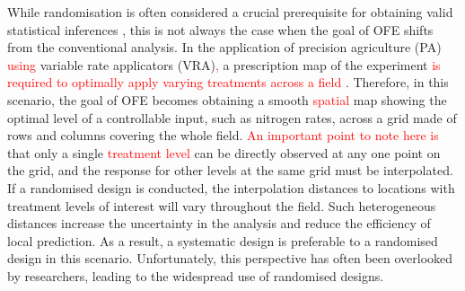 \documentclass[a4paper]{article} 	%
\newcommand{\revision}[1]{\textcolor{red}{#1}}
\begin{document}
While randomisation is often considered a crucial prerequisite for obtaining valid statistical inferences \parencite{Piepho2013Why}, this is not always the case when the goal of OFE shifts from the conventional analysis. In the application of precision agriculture (PA) \revision{using} variable rate applicators (VRA)\revision{,} a prescription map of the experiment \revision{is required to optimally apply varying treatments across a field} \parencite{Pringle2004FieldScale}. Therefore, in this scenario, the goal of OFE becomes obtaining a smooth \revision{spatial} map showing the optimal level of a controllable input, such as nitrogen rates, across a grid made of rows and columns covering the whole field. \revision{An important point to note here is} that only a single \revision{treatment level} can be directly observed at any one point on the grid, and the response for other levels at the same grid must be interpolated. If a randomised design is conducted, the interpolation distances to locations with treatment levels of interest will vary throughout the field. Such heterogeneous distances increase the uncertainty in the analysis and reduce the efficiency of local prediction. As a result, a systematic design is preferable to a randomised design in this scenario. Unfortunately, this perspective has often been overlooked by researchers, leading to the widespread use of randomised designs.
\end{document}

